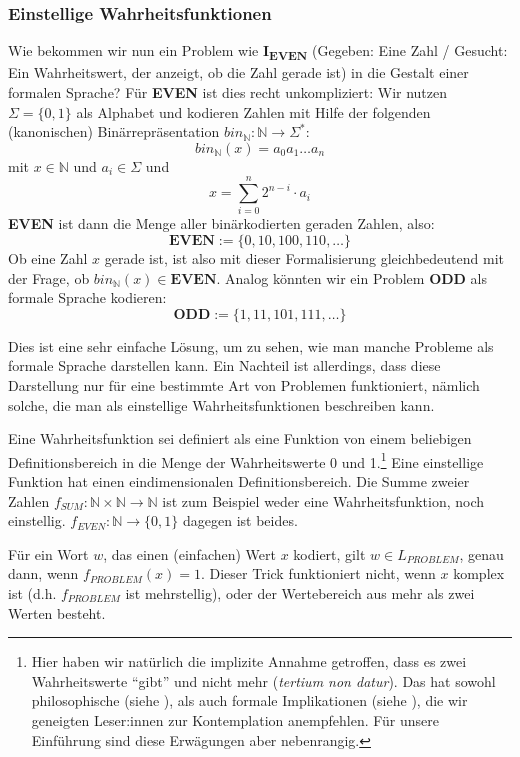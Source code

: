 \subsubsection{Einstellige Wahrheitsfunktionen}
Wie bekommen wir nun ein Problem wie \textbf{I\textsubscript{EVEN}}
(Gegeben: Eine Zahl / Gesucht: Ein Wahrheitswert, der anzeigt, ob die Zahl gerade ist)
in die Gestalt einer formalen Sprache?
Für \textbf{EVEN} ist dies recht unkompliziert:
Wir nutzen $\Sigma = \{0,1\}$ als Alphabet
und kodieren Zahlen mit Hilfe der folgenden (kanonischen) Binärrepräsentation
$bin_{\mathbb{N}}: \mathbb{N} \rightarrow \Sigma^*$:
\[
    bin_{\mathbb{N}}(x) = a_{0}a_{1} \ldots a_{n}
\]
mit $x \in \mathbb{N}$ und $a_i \in \Sigma$ und
\[
    x = \sum_{i=0}^n 2^{n-i} \cdot a_i
\]
\textbf{EVEN} ist dann die Menge aller binärkodierten geraden Zahlen, also:
\[
    \mathbf{EVEN} := \{0, 10, 100, 110, \ldots\}
\]
Ob eine Zahl $x$ gerade ist, ist also mit dieser Formalisierung gleichbedeutend mit der Frage,
ob $bin_{\mathbb{N}}(x) \in \mathbf{EVEN}$.
Analog könnten wir ein Problem \textbf{ODD} als formale Sprache kodieren:
\[
    \mathbf{ODD} := \{1, 11, 101, 111, \ldots \}
\]

Dies ist eine sehr einfache Lösung, um zu sehen,
wie man manche Probleme als formale Sprache darstellen kann.
Ein Nachteil ist allerdings, dass diese Darstellung
nur für eine bestimmte Art von Problemen funktioniert,
nämlich solche, die man als einstellige Wahrheitsfunktionen beschreiben kann.


Eine Wahrheitsfunktion sei definiert als eine Funktion von einem beliebigen Definitionsbereich
in die Menge der Wahrheitswerte 0 und 1.\footnote{
    Hier haben wir natürlich die implizite Annahme getroffen,
    dass es zwei Wahrheitswerte ``gibt'' und nicht mehr (\emph{tertium non datur}).
    Das hat sowohl philosophische (siehe \cite{sep-logic-manyvalued}), als auch formale Implikationen (siehe \cite{gottwald}),
    die wir geneigten Leser:innen zur Kontemplation anempfehlen.
    Für unsere Einführung sind diese Erwägungen aber nebenrangig.
}
Eine einstellige Funktion hat einen eindimensionalen Definitionsbereich.
Die Summe zweier Zahlen $f_{SUM}: \mathbb{N} \times \mathbb{N} \rightarrow \mathbb{N}$
ist zum Beispiel weder eine Wahrheitsfunktion,
noch einstellig.
$f_{EVEN}: \mathbb{N} \rightarrow \{0,1\}$ dagegen ist beides.

Für ein Wort $w$, das einen (einfachen) Wert $x$ kodiert,
gilt $w \in L_{PROBLEM}$, genau dann, wenn $f_{PROBLEM}(x) = 1$.
Dieser Trick funktioniert nicht,
wenn $x$ komplex ist (d.h. $f_{PROBLEM}$ ist mehrstellig),
oder der Wertebereich aus mehr als zwei Werten besteht.


